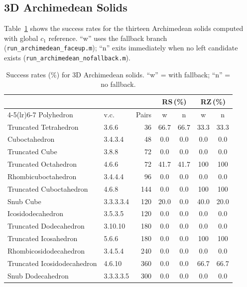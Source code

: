 \documentclass[12pt,a4paper]{article}
\theoremstyle{definition}
\begin{document}
\subsection{3D Archimedean Solids}
\label{ssec:res3darchimedean}

Table~\ref{tab:res3darchimedean} shows the success rates for the thirteen
Archimedean solids computed with global $c_1$ reference.
``w'' uses the fallback branch (\texttt{run\_archi\-medean\_faceup.m});
``n'' exits immediately when no left candidate exists
(\texttt{run\_archi\-medean\_nofallback.m}).

\begin{table}[h]
\centering
\caption{Success rates (\%) for 3D Archimedean solids.
  ``w'' = with fallback; ``n'' = no fallback.}
\label{tab:res3darchimedean}
\small
\setlength{\tabcolsep}{4pt}
\begin{tabular}{llrcccc}
\toprule
& & & \multicolumn{2}{c}{RS\,(\%)} & \multicolumn{2}{c}{RZ\,(\%)} \\
\cmidrule(lr){4-5}\cmidrule(lr){6-7}
Polyhedron & v.c. & Pairs & w & n & w & n \\
\midrule
Truncated Tetrahedron       & 3.6.6       &  36 & 66.7 & 66.7 & 33.3 & 33.3 \\
Cuboctahedron               & 3.4.3.4     &  48 &  0.0 &  0.0 &  0.0 &  0.0 \\
Truncated Cube              & 3.8.8       &  72 &  0.0 &  0.0 &  0.0 &  0.0 \\
Truncated Octahedron        & 4.6.6       &  72 & 41.7 & 41.7 & 100  & 100  \\
Rhombicuboctahedron         & 3.4.4.4     &  96 &  0.0 &  0.0 &  0.0 &  0.0 \\
Truncated Cuboctahedron     & 4.6.8       & 144 &  0.0 &  0.0 & 100  & 100  \\
Snub Cube                   & 3.3.3.3.4   & 120 & 20.0 &  0.0 & 40.0 & 20.0 \\
Icosidodecahedron           & 3.5.3.5     & 120 &  0.0 &  0.0 &  0.0 &  0.0 \\
Truncated Dodecahedron      & 3.10.10     & 180 &  0.0 &  0.0 &  0.0 &  0.0 \\
Truncated Icosahedron       & 5.6.6       & 180 &  0.0 &  0.0 & 100  & 100  \\
Rhombicosidodecahedron      & 3.4.5.4     & 240 &  0.0 &  0.0 &  0.0 &  0.0 \\
Truncated Icosidodecahedron & 4.6.10      & 360 &  0.0 &  0.0 & 66.7 & 66.7 \\
Snub Dodecahedron           & 3.3.3.3.5   & 300 &  0.0 &  0.0 &  0.0 &  0.0 \\
\bottomrule
\end{tabular}
\end{table}
\end{document}
